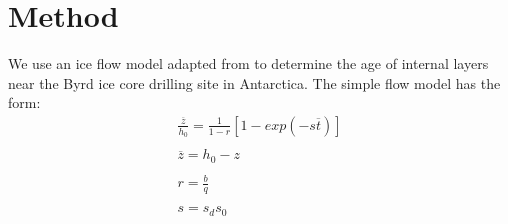 \documentclass[12pt]{article}
\begin{document}




\section{Method}\label{method}

We use an ice flow model adapted from \citet{morland2009} to determine the age of internal layers near the Byrd ice core drilling site in Antarctica.  The simple flow model has the form:
\begin{equation}
\begin{array}{l}
\displaystyle \frac{\overline{z}}{h_0} = \frac{1}{1 - r} [1 - exp(-s \overline{t})]\\
\\
\displaystyle \overline{z} = h_0 - z\\
\\
\displaystyle r = \frac{b}{q}\\
\\
\displaystyle s = s_ds_0\\
\end{array}
\end{equation}
\\
\end{document}
